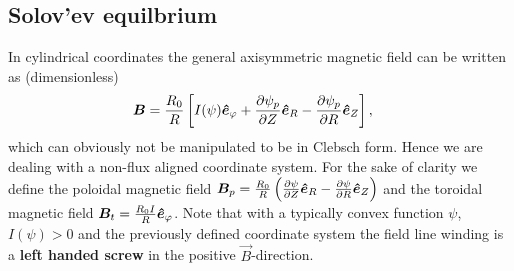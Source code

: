 \subsection{Solov'ev equilbrium}\label{sec:solovev}
In cylindrical coordinates the general axisymmetric  magnetic field can be written as (dimensionless)
\begin{align}
 {\boldsymbol{B}} &= \frac{R_0}{R}\left[I(\psi) \bm{\hat{e}}_{\varphi} + \frac{\partial
 \psi_p}{\partial Z} \bm{\hat{e}}_R -  \frac{\partial \psi_p}{\partial R} \bm{\hat{e}}_Z\right] ,
\end{align}
which can obviously not be manipulated to be in Clebsch form.
Hence we are dealing with a non-flux aligned coordinate system.
For the sake of clarity we define the poloidal magnetic field \( {\boldsymbol{B}}_p = \frac{R_0}{R}\left( \frac{\partial \psi}{\partial Z}\bm{\hat{e}}_R - \frac{\partial \psi}{\partial R}\bm{\hat{e}}_Z\right)
\) and the toroidal magnetic field \({\boldsymbol{B}}_t =\frac{R_0I}{R} \bm{\hat{e}}_{\varphi}\).
Note that with a typically convex function $\psi$, $I(\psi)>0$ and the previously defined coordinate system the field line winding is a {\bf left handed screw} in the positive $\vec B$-direction.

